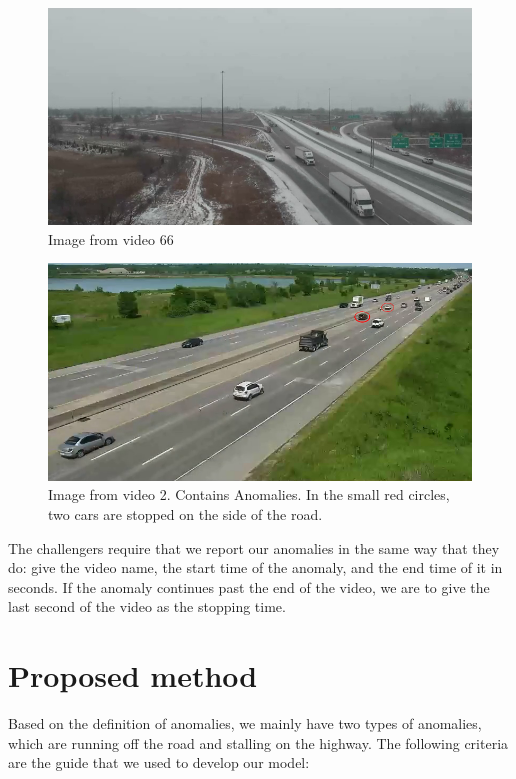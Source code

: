 \documentclass[10pt,twocolumn,letterpaper]{article}
\begin{document}
\begin{figure}  
    \includegraphics[scale=.29]{images/anomalyTrain66.png}
    \caption{Image from video 66}
    \label{train66}
\end{figure}

\begin{figure}  
    \includegraphics[scale=.29]{images/anomalyTrain2_focus.png}
    \caption{Image from video 2. Contains Anomalies. In the small red circles, two cars are stopped on the side of the road.}
    \label{train2}
\end{figure}


The challengers require that we report our anomalies in the same way that they do: give the video name, the start time of the anomaly, and the end time of it in seconds. If the anomaly continues past the end of the video, we are to give the last second of the video as the stopping time.


\section{Proposed method}

Based on the definition of anomalies, we mainly have two types of anomalies, which are running off the road and stalling on the highway. The following criteria are the guide that we used to develop our model:
\end{document}
